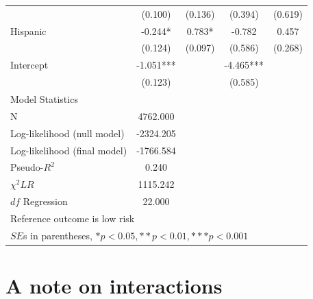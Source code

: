 \begin{table}[htbp]
\begin{tabular}{lcccc}
      &   (0.100)  &   (0.136)  &   (0.394)  &   (0.619)  \\
Hispanic     &   -0.244* &    0.783* &   -0.782  &    0.457  \\
      &   (0.124)  &   (0.097)  &   (0.586)  &   (0.268)  \\
Intercept    &   -1.051***&    &   -4.465***&    \\
      &   (0.123)  &    &   (0.585)  &   \\
\hline
\multicolumn{4}{l}{Model Statistics} \\
\hline
N      &  4762.000   \\
Log-likelihood (null model)    &  -2324.205   \\
Log-likelihood (final model)     & -1766.584   \\
Pseudo-$R^2$    &    0.240 \\
$\chi^2 LR$    &   1115.242  &     \\
$df$ Regression    &   22.000  &      \\
\hline
\multicolumn{4}{l}{Reference outcome is low risk} \\
\multicolumn{4}{l}{$SE$s in parentheses, $*p<0.05, **p<0.01, ***p<0.001$} \\
\hline
\end{tabular}
\end{table}


\section{A note on interactions}